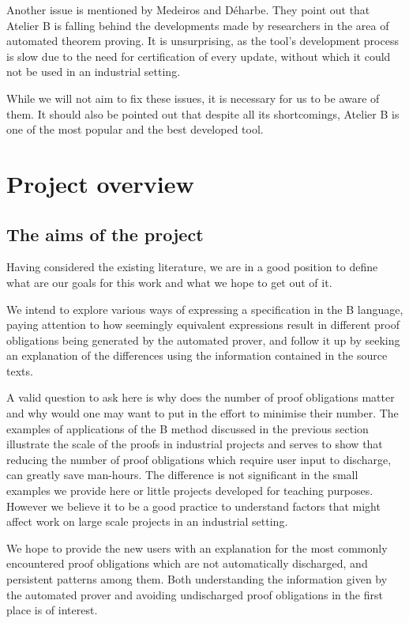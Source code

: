 \documentclass[12pt,journal,duplex]{IEEEtran}
\begin{document}
	Another issue is mentioned by Medeiros and D\'{e}harbe\cite{BEval}. They point out that Atelier B is falling behind the developments made by researchers in the area of automated theorem proving. It is unsurprising, as the tool's development process is slow due to the need for certification of every update, without which it could not be used in an industrial setting.

	While we will not aim to fix these issues, it is necessary for us to be aware of them. It should also be pointed out that despite all its shortcomings, Atelier B is one of the most popular and the best developed tool. 

	\section{Project overview}
	\subsection{The aims of the project}
	Having considered the existing literature, we are in a good position to define what are our goals for this work and what we hope to get out of it.

	We intend to explore various ways of expressing a specification in the B language, paying attention to how seemingly equivalent expressions result in different proof obligations being generated by the automated prover, and follow it up by seeking an explanation of the differences using the information contained in the source texts.

	A valid question to ask here is why does the number of proof obligations matter and why would one may want to put in the effort to minimise their number. The examples of applications of the B method discussed in the previous section illustrate the scale of the proofs in industrial projects and serves to show that reducing the number of proof obligations which require user input to discharge, can greatly save man-hours. The difference is not significant in the small examples we provide here or little projects developed for teaching purposes. However we believe it to be a good practice to understand factors that might affect work on large scale projects in an industrial setting.

	We hope to provide the new users with an explanation for the most commonly encountered proof obligations which are not automatically discharged, and persistent patterns among them. Both understanding the information given by the automated prover and avoiding undischarged proof obligations in the first place is of interest.
\end{document}
